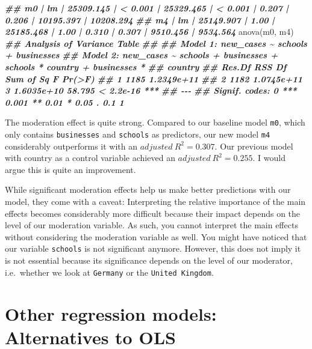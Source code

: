 \documentclass[
]{book}
\newenvironment{Shaded}{\begin{snugshade}}{\end{snugshade}}
\newcommand{\DocumentationTok}[1]{\textcolor[rgb]{0.56,0.35,0.01}{\textbf{\textit{#1}}}}
\newcommand{\FunctionTok}[1]{\textcolor[rgb]{0.00,0.00,0.00}{#1}}
\newcommand{\NormalTok}[1]{#1}
\begin{document}
\begin{Shaded}
\begin{Highlighting}[]
\DocumentationTok{\#\# m0   |    lm | 25309.145 | \textless{} 0.001 | 25329.465 | \textless{} 0.001 | 0.207 |     0.206 | 10195.397 | 10208.294}
\DocumentationTok{\#\# m4   |    lm | 25149.907 |    1.00 | 25185.468 |    1.00 | 0.310 |     0.307 |  9510.456 |  9534.564}
\FunctionTok{anova}\NormalTok{(m0, m4)}
\DocumentationTok{\#\# Analysis of Variance Table}
\DocumentationTok{\#\# }
\DocumentationTok{\#\# Model 1: new\_cases \textasciitilde{} schools + businesses}
\DocumentationTok{\#\# Model 2: new\_cases \textasciitilde{} schools + businesses + schools * country + businesses * }
\DocumentationTok{\#\#     country}
\DocumentationTok{\#\#   Res.Df        RSS Df  Sum of Sq      F    Pr(\textgreater{}F)    }
\DocumentationTok{\#\# 1   1185 1.2349e+11                                   }
\DocumentationTok{\#\# 2   1182 1.0745e+11  3 1.6035e+10 58.795 \textless{} 2.2e{-}16 ***}
\DocumentationTok{\#\# {-}{-}{-}}
\DocumentationTok{\#\# Signif. codes:  0 \textquotesingle{}***\textquotesingle{} 0.001 \textquotesingle{}**\textquotesingle{} 0.01 \textquotesingle{}*\textquotesingle{} 0.05 \textquotesingle{}.\textquotesingle{} 0.1 \textquotesingle{} \textquotesingle{} 1}
\end{Highlighting}
\end{Shaded}

The moderation effect is quite strong. Compared to our baseline model \texttt{m0}, which only contains \texttt{businesses} and \texttt{schools} as predictors, our new model \texttt{m4} considerably outperforms it with an \(adjusted\ R^2 = 0.307\). Our previous model with country as a control variable achieved an \(adjusted\ R^2 = 0.255\). I would argue this is quite an improvement.

While significant moderation effects help us make better predictions with our model, they come with a caveat: Interpreting the relative importance of the main effects becomes considerably more difficult because their impact depends on the level of our moderation variable. As such, you cannot interpret the main effects without considering the moderation variable as well. You might have noticed that our variable \texttt{schools} is not significant anymore. However, this does not imply it is not essential because its significance depends on the level of our moderator, i.e.~whether we look at \texttt{Germany} or the \texttt{United\ Kingdom}.

\hypertarget{other-regression-models-alternatives-to-ols}{%
\section{Other regression models: Alternatives to OLS}\label{other-regression-models-alternatives-to-ols}}
\end{document}
